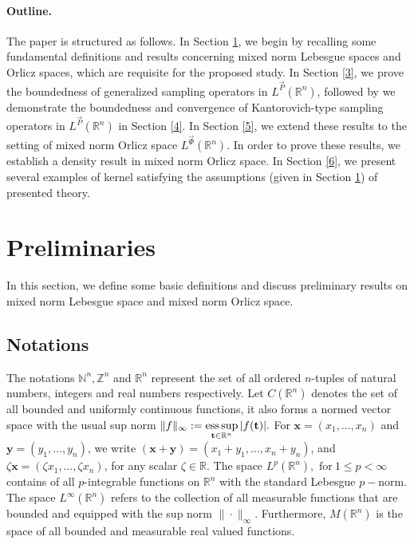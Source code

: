 \documentclass[11pt, a4paper]{article}
\theoremstyle{definition}
\numberwithin{equation}{section}
\def\NN{\mathbb N}
\def\ZZ{\mathbb Z}
\def\RR{\mathbb R}
\def\esssup{\mathop{\textup{ess}\sup}}
\begin{document}
 
\paragraph{Outline.}
The paper is structured as follows. In Section \ref{2}, we begin by recalling some fundamental definitions and results concerning mixed norm Lebesgue spaces and Orlicz spaces, which are requisite for the proposed study. In Section \ref{3}, we prove the boundedness of generalized sampling operators in $L^{\overrightarrow{P}}(\RR^n)$, followed by we demonstrate the boundedness and convergence of Kantorovich-type sampling operators in  $L^{\overrightarrow{P}}(\RR^n)$ in Section \ref{4}. 
In Section \ref{5}, we extend these results to the setting of mixed norm Orlicz space $L^{\overrightarrow{\Phi}}(\RR^n)$. In order to prove these results, we establish a density result in mixed norm Orlicz space.
In Section \ref{6}, we present several examples of kernel satisfying the assumptions (given in Section \ref{2}) of presented theory. 
 
\section{Preliminaries} \label{2} 
In this section, we define some basic definitions and discuss preliminary results on mixed norm Lebesgue space and mixed norm Orlicz space.

\subsection{Notations}
The notations $\NN^n, \ZZ ^n $ and $\RR ^n$ represent the set of all ordered $n$-tuples of natural numbers, integers and real numbers respectively. Let $C(\mathbb{R}^n)$ denotes the set of all bounded and uniformly continuous functions, it also forms a normed vector space with the usual sup norm $\displaystyle \|f\|_{\infty}:= \esssup_{\textbf{t} \in \RR^n} |f(\textbf{t})|.$  For $\textbf{x}=(x_1,\dots,x_n)$  and  $\textbf{y}=(y_1,\dots,y_n)$, we write $(\textbf{x}+\textbf{y})=(x_1+y_1,\dots,x_n+y_n)$, and
$\zeta\textbf{x}=(\zeta x_1,\dots,\zeta x_n)$, for any scalar $\zeta \in \RR$.
The space $L^{p}(\mathbb{R}^n), \hspace{4pt}\text{for}\ 1 \leq p < \infty$ contains of all $p$-integrable functions on $\mathbb{R}^n$ with the standard Lebesgue $p-$norm. The space $L^{\infty}(\mathbb{R}^n)$ refers to the collection of all measurable functions that are bounded and equipped with the sup norm $\|\cdot\|_{\infty}$. Furthermore, $M(\RR^n)$ is the space of all bounded and measurable real valued functions.
    
\end{document}
